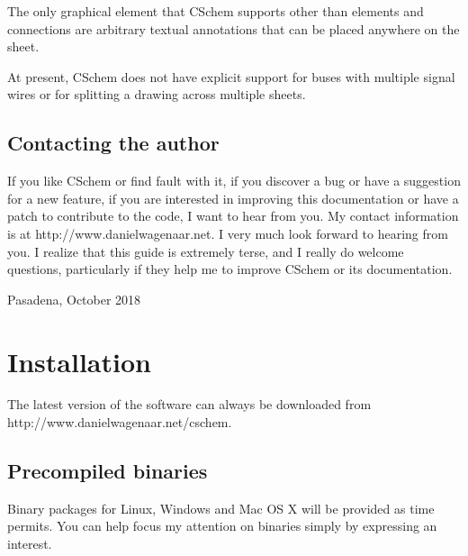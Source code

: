 \documentclass[11pt]{report}
\begin{document}
The only graphical element that CSchem supports other than elements
and connections are arbitrary textual annotations that can be placed anywhere on
the sheet.

At present, CSchem does not have explicit support for buses with
multiple signal wires or for splitting a drawing across multiple sheets.

\section{Contacting the author}

If you like CSchem or find fault with it, if you discover a bug or have a
suggestion for a new feature, if you are interested in improving this
documentation or have a patch to contribute to the code, I want to
hear from you. My contact information is at
http://www.danielwagenaar.net. I very much look forward to hearing
from you. I realize that this guide is extremely terse, and I
really do welcome questions, particularly if they help me to improve
CSchem or its documentation.\bigskip

\noindent Pasadena, October 2018

\chapter{Installation}

The latest version of the software can always be downloaded from\break
http://www.danielwagenaar.net/cschem.

\section{Precompiled binaries}

Binary packages for Linux, Windows and Mac OS X will be provided as time
permits. You can help focus my attention on binaries simply by
expressing an interest.


\end{document}
